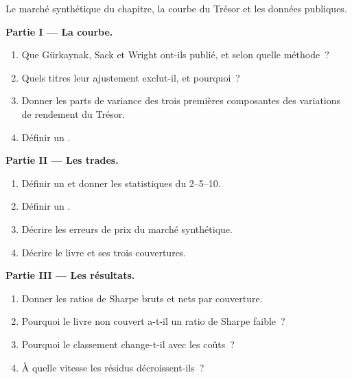 \begin{problem}\label{pb:s2:government-bond-relative-value:1}
Le marché synthétique du chapitre, la courbe du Trésor et les données publiques.

\medskip\noindent\textbf{Partie I --- La courbe.}
\begin{enumerate}
\item Que Gürkaynak, Sack et Wright ont-ils publié, et selon quelle méthode~?
\item Quels titres leur ajustement exclut-il, et pourquoi~?
\item Donner les parts de variance des trois premières composantes des variations de rendement du Trésor.
\item Définir un .
\end{enumerate}

\medskip\noindent\textbf{Partie II --- Les trades.}
\begin{enumerate}[resume]
\item Définir un  et donner les statistiques du 2--5--10.
\item Définir un .
\item Décrire les erreurs de prix du marché synthétique.
\item Décrire le livre et ses trois couvertures.
\end{enumerate}

\medskip\noindent\textbf{Partie III --- Les résultats.}
\begin{enumerate}[resume]
\item Donner les ratios de Sharpe bruts et nets par couverture.
\item Pourquoi le livre non couvert a-t-il un ratio de Sharpe faible~?
\item Pourquoi le classement change-t-il avec les coûts~?
\item À quelle vitesse les résidus décroissent-ils~?
\end{enumerate}


\end{problem}

